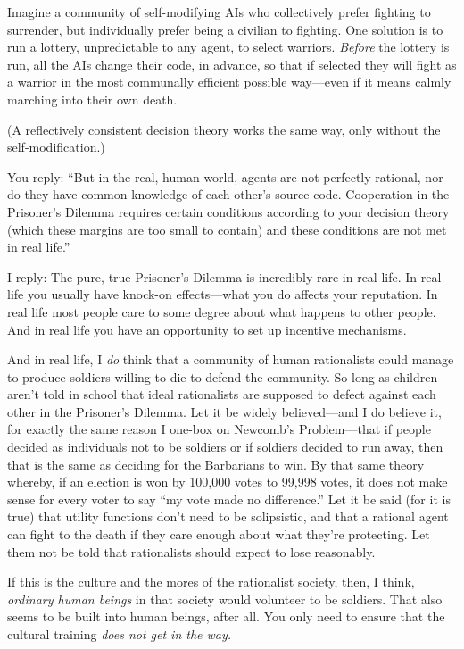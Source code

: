 {
 Imagine a community of self-modifying AIs who collectively prefer
fighting to surrender, but individually prefer being a civilian to
fighting. One solution is to run a lottery, unpredictable to any agent,
to select warriors. \textit{Before} the lottery is run, all the AIs
change their code, in advance, so that if selected they will fight as a
warrior in the most communally efficient possible way---even if it
means calmly marching into their own death.}

{
 (A reflectively consistent decision theory works the same way,
only without the self-modification.)}

{
 You reply: ``But in the real, human world, agents
are not perfectly rational, nor do they have common knowledge of each
other's source code. Cooperation in the
Prisoner's Dilemma requires certain conditions
according to your decision theory (which these margins are too small to
contain) and these conditions are not met in real
life.''}

{
 I reply: The pure, true Prisoner's Dilemma is
incredibly rare in real life. In real life you usually have knock-on
effects---what you do affects your reputation. In real life most people
care to some degree about what happens to other people. And in real
life you have an opportunity to set up incentive mechanisms.}

{
 And in real life, I \textit{do} think that a community of human
rationalists could manage to produce soldiers willing to die to defend
the community. So long as children aren't told in
school that ideal rationalists are supposed to defect against each
other in the Prisoner's Dilemma. Let it be widely
believed---and I do believe it, for exactly the same reason I one-box
on Newcomb's Problem---that if people decided as
individuals not to be soldiers or if soldiers decided to run away, then
that is the same as deciding for the Barbarians to win. By that same
theory whereby, if an election is won by 100,000 votes to 99,998 votes,
it does not make sense for every voter to say ``my
vote made no difference.'' Let it be said (for it is
true) that utility functions don't need to be
solipsistic, and that a rational agent can fight to the death if they
care enough about what they're protecting. Let them not
be told that rationalists should expect to lose reasonably.}

{
 If this is the culture and the mores of the rationalist society,
then, I think, \textit{ordinary human beings} in that society would
volunteer to be soldiers. That also seems to be built into human
beings, after all. You only need to ensure that the cultural training
\textit{does not get in the way.}}

